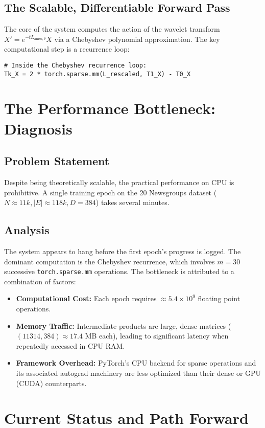 \documentclass[11pt, letterpaper]{article}
\begin{document}
\subsection{The Scalable, Differentiable Forward Pass}
The core of the system computes the action of the wavelet transform $X' = e^{-tL_{\text{aniso}, \theta}}X$ via a Chebyshev polynomial approximation. The key computational step is a recurrence loop:
\begin{lstlisting}
# Inside the Chebyshev recurrence loop:
Tk_X = 2 * torch.sparse.mm(L_rescaled, T1_X) - T0_X
\end{lstlisting}

\section{The Performance Bottleneck: Diagnosis}

\subsection{Problem Statement}
Despite being theoretically scalable, the practical performance on CPU is prohibitive. A single training epoch on the 20 Newsgroups dataset ($N \approx 11k, |E| \approx 118k, D=384$) takes several minutes.

\subsection{Analysis}
The system appears to hang before the first epoch's progress is logged. The dominant computation is the Chebyshev recurrence, which involves $m=30$ successive \texttt{torch.sparse.mm} operations. The bottleneck is attributed to a combination of factors:
\begin{itemize}
    \item \textbf{Computational Cost:} Each epoch requires $\approx 5.4 \times 10^9$ floating point operations.
    \item \textbf{Memory Traffic:} Intermediate products are large, dense matrices ($(11314, 384) \approx 17.4$ MB each), leading to significant latency when repeatedly accessed in CPU RAM.
    \item \textbf{Framework Overhead:} PyTorch's CPU backend for sparse operations and its associated autograd machinery are less optimized than their dense or GPU (CUDA) counterparts.
\end{itemize}

\section{Current Status and Path Forward}
\end{document}
